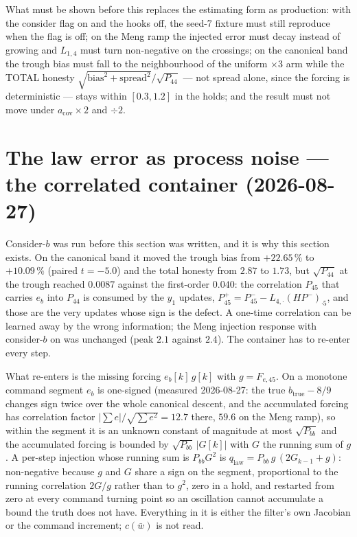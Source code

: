 \documentclass[11pt,a4paper,fontset=none]{ctexart}
\newcommand{\bw}{\bar{w}}
\begin{document}
What must be shown before this replaces the estimating form as production:
with the consider flag on and the hooks off, the seed-7 fixture must still
reproduce when the flag is off; on the Meng ramp the injected error must decay
instead of growing and $L_{1,4}$ must turn non-negative on the crossings; on the
canonical band the trough bias must fall to the neighbourhood of the uniform
$\times 3$ arm while the TOTAL honesty $\sqrt{\text{bias}^{2}+\text{spread}^{2}}
/ \sqrt{P_{44}}$ --- not spread alone, since the forcing is deterministic ---
stays within $[0.3, 1.2]$ in the holds; and the result must not move under
$a_{\mathrm{cov}} \times 2$ and $\div 2$.

\section*{The law error as process noise --- the correlated container (2026-08-27)}

Consider-$b$ was run before this section was written, and it is why this
section exists. On the canonical band it moved the trough bias from
$+22.65\,\%$ to $+10.09\,\%$ (paired $t = -5.0$) and the total honesty from
$2.87$ to $1.73$, but $\sqrt{P_{44}}$ at the trough reached $0.0087$ against the
first-order $0.040$: the correlation $P_{45}$ that carries $e_b$ into $P_{44}$
is consumed by the $y_1$ updates, $P_{45}^{+} = P_{45}^{-} - L_{4,\cdot}(HP^-)_{\cdot 5}$,
and those are the very updates whose sign is the defect. A one-time correlation
can be learned away by the wrong information; the Meng injection response with
consider-$b$ on was unchanged (peak $2.1$ against $2.4$). The container has to
re-enter every step.

What re-enters is the missing forcing $e_b[k]\,g[k]$ with $g = F_{e,45}$. On a
monotone command segment $e_b$ is one-signed (measured 2026-08-27: the true
$b_{\mathrm{true}} - 8/9$ changes sign twice over the whole canonical descent,
and the accumulated forcing has correlation factor $|\sum e|/\sqrt{\sum e^{2}}
= 12.7$ there, $59.6$ on the Meng ramp), so within the segment it is an unknown
constant of magnitude at most $\sqrt{P_{bb}}$ and the accumulated forcing is
bounded by $\sqrt{P_{bb}}\,|G[k]|$ with $G$ the running sum of $g$. A per-step
injection whose running sum is $P_{bb}G^{2}$ is $q_{\mathrm{law}} =
P_{bb}\,g\,(2G_{k-1} + g)$: non-negative because $g$ and $G$ share a sign on the
segment, proportional to the running correlation $2G/g$ rather than to $g^{2}$,
zero in a hold, and restarted from zero at every command turning point so an
oscillation cannot accumulate a bound the truth does not have. Everything in it
is either the filter's own Jacobian or the command increment; $c(\bw)$ is not
read.
\end{document}
